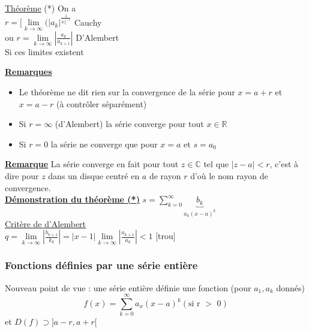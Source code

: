\documentclass[12pt,a4paper]{article}
\newcommand{\somme}[2]{\ensuremath{\sum\limits_{#2}^{#1}}}
\newcommand{\limite}{\lim\limits_}
\newcommand{\evid}[1]{\textbf{\underline{#1}}}
\newcommand{\R}{\ensuremath{\mathbb{R}} }
\newcommand{\C}{\ensuremath{\mathbb{C}} }
\newcommand{\Theoreme}{\underline{Théorème} }
\begin{document}
{\begin{boite}
	\Theoreme (*) On a \\
	$r = [\limite{k\to\infty}(|a_k|^{\frac{1}{k(]^{-1}}}$ Cauchy\\
	ou $r = \limite{k\to\infty} \left|\frac{a_k}{a_{k+1}}\right|$ D’Alembert\\
	Si ces limites existent
\end{boite}
\evid{Remarques}
\begin{itemize}
	\item Le théorème ne dit rien sur la convergence de la série pour $x = a+r$ et $x=a-r$ (à contrôler séparément)
	\item Si $r = \infty$ (d'Alembert) la série converge pour tout $x\in\R$
	\item Si $r=0$ la série ne converge que pour $x = a$ et $s = a_0$
\end{itemize}
\evid{Remarque} La série converge en fait pour tout $z \in \C$ tel que $|z-a| <r$, c'est à dire pour $z$ dans un disque centré en $a$ de rayon $r$ d'où le nom rayon de convergence.\\
\evid{Démonstration du théorème (*)} $s = \somme{\infty}{k=0}{\underbrace{b_k}_{a_k(x-a)^k}}$\\
\underline{Critère de d'Alembert}\\
$q = \limite{k\to\infty} \left|\frac{b_{k+1}}{k_k}\right| = |x-1|\limite{k\to\infty}\left|\frac{a_{k+1}}{a_k}\right| < 1$
[trou]
\subsubsection{Fonctions définies par une série entière}
\begin{boite}
Nouveau point de vue : une série entière définie une fonction (pour $a_1,a_k$ donnés)
\begin{equation}
	f(x) = \somme{\infty}{k=0}{a_x(x-a)^k} (\text{si r $>$ 0})
\end{equation}
et $D(f) \supset ]a-r,a+r[$
\end{boite}
}
\end{document}

